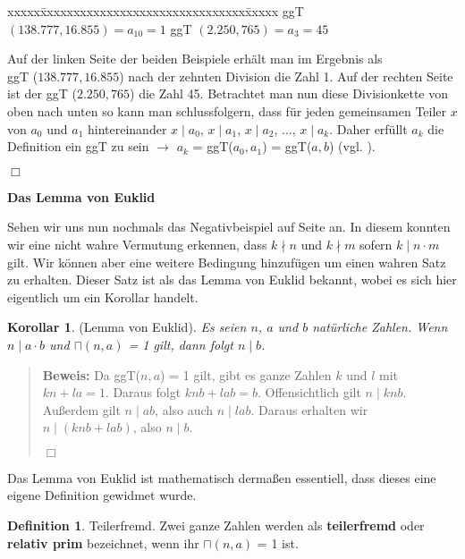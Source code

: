 \documentclass[12pt,a4paper]{article}
\theoremstyle{definition}
\newtheorem{defi}{Definition}[section]
\newtheorem{corollar}{Korollar}[subsection]
\begin{document}
\begin{tabbing}
xxxxx\=xxxxxxxxxxxxxxxxxxxxxxxxxxxxxxx\=xxxxx\kill
\> ggT $(138.777, 16.855) = a_{10} = 1$ \> ggT $(2.250, 765) = a_3 = 45$
\end{tabbing}

Auf der linken Seite der beiden Beispiele erhält man im Ergebnis als\\
ggT ($138.777, 16.855$) nach der zehnten Division die Zahl 1. Auf der rechten Seite ist der ggT ($2.250, 765$) die Zahl 45.
Betrachtet man nun diese Divisionkette von oben nach unten so kann man schlussfolgern, dass für jeden gemeinsamen Teiler $x$ von $a_0$ und $a_1$ hintereinander $x \mid a_0$, $x \mid a_1$, $x \mid a_2$, ..., $x \mid a_k$.\newline
Daher erfüllt $a_k$ die Definition ein ggT zu sein $\to$ $a_k$ = ggT($a_0,a_1$) = ggT($a, b$) (vgl. \cite[58--59]{Remmert1995}).
\begin{flushright}
$\Box$
\end{flushright}

\newpage
\textbf{Das Lemma von Euklid}

Sehen wir uns nun nochmals das Negativbeispiel auf Seite \pageref{Negativbeispiel} an.
In diesem konnten wir eine nicht wahre Vermutung erkennen, dass $k \nmid n$ und $k \nmid m$ sofern $k \mid n \cdot m$ gilt.
Wir können aber eine weitere Bedingung hinzufügen um einen wahren Satz zu erhalten.
Dieser Satz ist als das Lemma von Euklid bekannt, wobei es sich hier eigentlich um ein Korollar handelt.

\begin{corollar}(Lemma von Euklid).\newline
\textit{Es seien $n$, $a$ und $b$ natürliche Zahlen.\newline
Wenn $n \mid a \cdot b$ und $\sqcap(n,a)$ = 1 gilt, dann folgt $n \mid b$.}
\end{corollar}

\begin{quote}
\small
\textbf{Beweis:} Da ggT($n, a$) = 1 gilt, gibt es ganze Zahlen $k$ und $l$ mit $kn + la = 1$.
Daraus folgt $knb + lab = b$.
Offensichtlich gilt $n \mid knb$.
Außerdem gilt $n \mid ab$, also auch $n \mid lab$.\newline
Daraus erhalten wir $n \mid (knb + lab)$, also $n \mid b$.\newline
\autocite[246--247]{Houston2012}
\begin{flushright}
$\Box$
\end{flushright}
\end{quote}
Das Lemma von Euklid ist mathematisch dermaßen essentiell, dass dieses eine eigene Definition gewidmet wurde.
\begin{defi}{Teilerfremd}.\newline
Zwei ganze Zahlen werden als \textbf{teilerfremd} oder \textbf{relativ prim} bezeichnet, wenn ihr $\sqcap(n, a)$ = 1 ist.
\end{defi}
\end{document}
